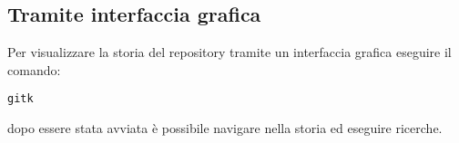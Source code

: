 \subsection{Tramite interfaccia grafica}
Per visualizzare la storia del repository tramite un interfaccia grafica eseguire il comando:

\begin{center}
\texttt{gitk}
\end{center}

dopo essere stata avviata è possibile navigare nella storia ed eseguire ricerche.